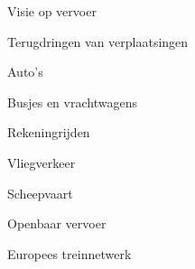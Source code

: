 
\begin{voorstel}{Visie op vervoer}\end{voorstel}

\begin{voorstel}{Terugdringen van verplaatsingen}\end{voorstel}
\begin{voorstel}{Auto’s}\end{voorstel}
\begin{voorstel}{Busjes en vrachtwagens}\end{voorstel}
\begin{voorstel}{Rekeningrijden}\end{voorstel}
\begin{voorstel}{Vliegverkeer}\end{voorstel}
\begin{voorstel}{Scheepvaart}\end{voorstel}
\begin{voorstel}{Openbaar vervoer}\end{voorstel}
\begin{voorstel}{Europees treinnetwerk}\end{voorstel}